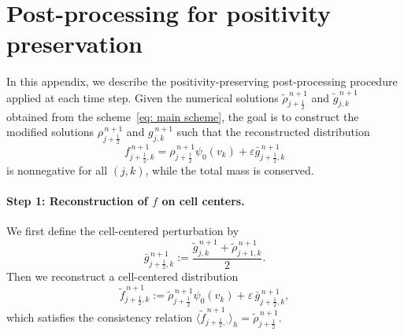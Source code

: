 \documentclass[11pt,twoside]{article}
\theoremstyle{nonumberplain}
\begin{document}
\section{Post-processing for positivity preservation}\label{sec:limiter}
In this appendix, we describe the positivity-preserving post-processing procedure applied at each time step.  
Given the numerical solutions $\tilde{\rho}_{j+\frac12}^{\,n+1}$ and $\tilde{g}_{j,k}^{\,n+1}$ obtained from the scheme~\eqref{eq: main scheme}, the goal is to construct the modified solutions $\rho_{j+\frac12}^{\,n+1}$ and $g_{j,k}^{\,n+1}$ such that the reconstructed distribution
\[
    f_{j+\frac12,k}^{\,n+1} 
    = \rho_{j+\frac12}^{\,n+1}\psi_0(v_k)
    + \varepsilon \bar{g}_{j+\frac12,k}^{\,n+1}
\]
is nonnegative for all $(j,k)$, while the total mass is conserved.






\paragraph{Step 1: Reconstruction of $f$ on cell centers.}
We first define the cell-centered perturbation by
\[
    \bar{g}_{j+\frac12,k}^{\,n+1}
    := \frac{\tilde{g}_{j,k}^{\,n+1}
    + \tilde{\rho}_{j+1,k}^{\,n+1}}{2}.
\]
Then we reconstruct a cell-centered distribution
\[
    \tilde{f}_{j+\frac12,k}^{\,n+1}
    := \tilde{\rho}_{j+\frac12}^{\,n+1}\psi_0(v_k)
     + \varepsilon\,\bar{g}_{j+\frac12,k}^{\,n+1},
\]
which satisfies the consistency relation  
$\langle \tilde{f}_{j+\frac12,\cdot}^{\,n+1}\rangle_h = \tilde{\rho}_{j+\frac12}^{\,n+1}$.
\end{document}
